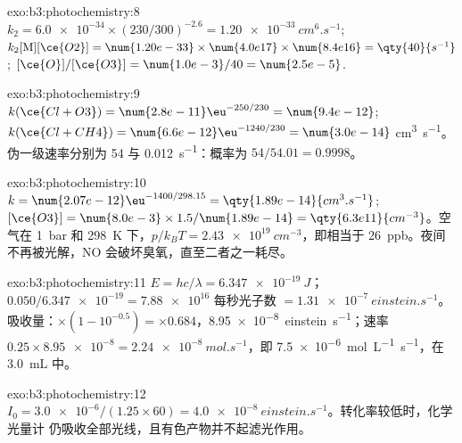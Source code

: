 \begin{solution}{exo:b3:photochemistry:8}
$k_2 = \num{6.0e-34} \times (230/300)^{-2.6} = \qty{1.20e-33}{cm^6.s^{-1}}$; $k_2[\mathrm M][\ce{O2}] = \num{1.20e-33} \times
\num{4.0e17} \times \num{8.4e16} = \qty{40}{s^{-1}}$; $[\ce{O}]/[\ce{O3}] = \num{1.0e-3}/40 = \num{2.5e-5}$.
\end{solution}

\begin{solution}{exo:b3:photochemistry:9}
$k(\ce{Cl + O3}) = \num{2.8e-11}\eu^{-250/230} = \num{9.4e-12}$; $k(\ce{Cl + CH4}) = \num{6.6e-12}\eu^{-1240/230} = \num{3.0e-14}$
\unit{cm^3.s^{-1}}。伪一级速率分别为 54 与 \qty{0.012}{s^{-1}}：概率为 $54/54.01 = 0.9998$。
\end{solution}

\begin{solution}{exo:b3:photochemistry:10}
$k = \num{2.07e-12}\eu^{-1400/298.15} = \qty{1.89e-14}{cm^3.s^{-1}}$; $[\ce{O3}] = \num{8.0e-3} \times 1.5/\num{1.89e-14} =
\qty{6.3e11}{cm^{-3}}$。空气在 \qty{1}{bar} 和 \qty{298}{K} 下，$p/k_BT = \qty{2.43e19}{cm^{-3}}$，即相当于 \qty{26}{ppb}。夜间
 不再被光解，NO 会破坏臭氧，直至二者之一耗尽。
\end{solution}

\begin{solution}{exo:b3:photochemistry:11}
$E = hc/\lambda = \qty{6.347e-19}{J}$；$0.050/\num{6.347e-19} = \num{7.88e16}$ 每秒光子数 $= \qty{1.31e-7}{einstein.s^{-1}}$。
吸收量：$\times(1 - 10^{-0.5}) = \times0.684$，\qty{8.95e-8}{einstein.s^{-1}}；速率 $0.25 \times \num{8.95e-8} =
\qty{2.24e-8}{mol.s^{-1}}$，即 \qty{7.5e-6}{mol.L^{-1}.s^{-1}}，在 \qty{3.0}{mL} 中。
\end{solution}

\begin{solution}{exo:b3:photochemistry:12}
$I_0 = \num{3.0e-6}/(1.25 \times 60) = \qty{4.0e-8}{einstein.s^{-1}}$。转化率较低时，化学光量计
仍吸收全部光线，且有色产物并不起滤光作用。
\end{solution}

